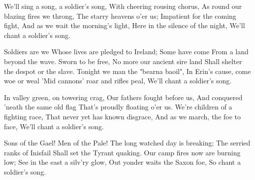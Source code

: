 \beginverse
We'll sing a song, a soldier's song,
With cheering rousing chorus,
As round our blazing fires we throng,
The starry heavens o'er us;
Impatient for the coming fight,
And as we wait the morning's light,
Here in the silence of the night,
We'll chant a soldier's song.
\endverse

\beginchorus
Soldiers are we
Whose lives are pledged to Ireland;
Some have come
From a land beyond the wave.
Sworn to be free,
No more our ancient sire land
Shall shelter the despot or the slave.
Tonight we man the "bearna baoil",
In Erin's cause, come woe or weal
'Mid cannons' roar and rifles peal,
We'll chant a soldier's song.
\endchorus

\beginverse
In valley green, on towering crag,
Our fathers fought before us,
And conquered 'neath the same old flag
That's proudly floating o'er us.
We're children of a fighting race,
That never yet has known disgrace,
And as we march, the foe to face,
We'll chant a soldier's song.
\endverse

\beginverse
Sons of the Gael! Men of the Pale!
The long watched day is breaking;
The serried ranks of Inisfail
Shall set the Tyrant quaking.
Our camp fires now are burning low;
See in the east a silv'ry glow,
Out yonder waits the Saxon foe,
So chant a soldier's song.
\endverse
\endsong
